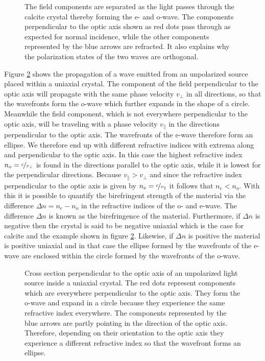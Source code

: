 \begin{figure}[h]
    \centering
    
    \caption{The field components are separated as the light passes through the calcite crystal thereby forming the e- and o-wave. The components perpendicular to the optic axis shown as red dots pass through as expected for normal incidence, while the other components represented by the blue arrows are refracted. It also explains why the polarization states of the two waves are orthogonal.}
    \label{fig:calcite_beams}
\end{figure}

Figure \ref{fig:uniaxial_source} shows the propagation of a wave emitted from an unpolarized source placed within a uniaxial crystal. The component of the field perpendicular to the optic axis will propagate with the same phase velocity $v_{\bot}$ in all directions, so that the wavefronts form the o-wave which further expands in the shape of a circle. Meanwhile the field component, which is not everywhere perpendicular to the optic axis, will be traveling with a phase velocity $v_{\parallel}$ in the directions perpendicular to the optic axis. The wavefronts of the e-wave therefore form an ellipse. We therefore end up with different refractive indices with extrema along and perpendicular to the optic axis. In this case the highest refractive index $n_o = \nicefrac{c}{v_{\bot}}$ is found in the directions parallel to the optic axis, while it is lowest for the perpendicular directions. Because $v_{\parallel} > v_{\bot}$ and since the refractive index perpendicular to the optic axis is given by $n_e = \nicefrac{c}{v_{\parallel}}$ it follows that $n_e < n_o$. With this it is possible to quantify the birefringent strength of the material via the difference $\Delta n = n_e - n_o$ in the refractive indices of the o- and e-wave. The difference $\Delta n$ is known as the birefringence of the material. Furthermore, if $\Delta n$ is negative then the crystal is said to be negative uniaxial which is the case for calcite and the example shown in figure \ref{fig:uniaxial_source}. Likewise, if $\Delta n$ is positive the material is positive uniaxial and in that case the ellipse formed by the wavefronts of the e-wave are enclosed within the circle formed by the wavefronts of the o-wave. 

\begin{figure}[h]
    \centering
    
    \caption{Cross section perpendicular to the optic axis of an unpolarized light source inside a uniaxial crystal. The red dots represent components which are everywhere perpendicular to the optic axis. They form the o-wave and expand in a circle because they experience the same refractive index everywhere. The components represented by the blue arrows are partly pointing in the direction of the optic axis. Therefore, depending on their orientation to the optic axis they experience a different refractive index so that the wavefront forms an ellipse.}
    \label{fig:uniaxial_source}
\end{figure}

